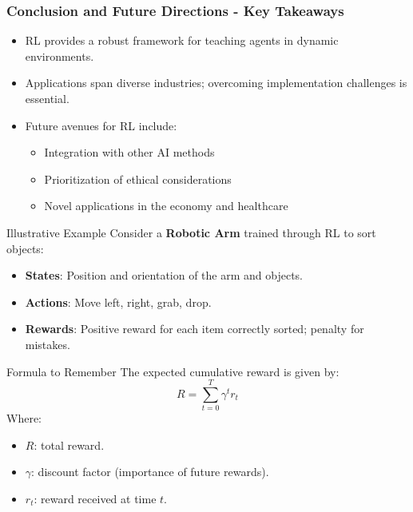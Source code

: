 \documentclass{beamer}
\begin{document}
\begin{frame}[fragile]
    \frametitle{Conclusion and Future Directions - Key Takeaways}
    \begin{itemize}
        \item RL provides a robust framework for teaching agents in dynamic environments.
        \item Applications span diverse industries; overcoming implementation challenges is essential.
        \item Future avenues for RL include:
        \begin{itemize}
            \item Integration with other AI methods
            \item Prioritization of ethical considerations
            \item Novel applications in the economy and healthcare
        \end{itemize}
    \end{itemize}

    \begin{block}{Illustrative Example}
        Consider a \textbf{Robotic Arm} trained through RL to sort objects:
        \begin{itemize}
            \item \textbf{States}: Position and orientation of the arm and objects.
            \item \textbf{Actions}: Move left, right, grab, drop.
            \item \textbf{Rewards}: Positive reward for each item correctly sorted; penalty for mistakes.
        \end{itemize}
    \end{block}

    \begin{block}{Formula to Remember}
        The expected cumulative reward is given by:
        \begin{equation}
            R = \sum_{t=0}^{T} \gamma^t r_t
        \end{equation}
        Where:
        \begin{itemize}
            \item \( R \): total reward.
            \item \( \gamma \): discount factor (importance of future rewards).
            \item \( r_t \): reward received at time \( t \).
        \end{itemize}
    \end{block}
\end{frame}
\end{document}
